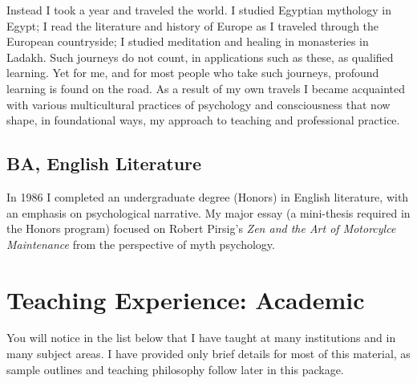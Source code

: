 \documentclass[10pt,DIV09,letterpaper,oneside,headsepline]{scrreprt}
\begin{document}
Instead I took a year and traveled the world. I studied Egyptian mythology in Egypt; I read the literature and history of Europe as I traveled through the European countryside; I studied meditation and healing in monasteries in Ladakh. Such journeys do not count, in applications such as these, as qualified learning. Yet for me, and for most people who take such journeys, profound learning is found on the road. As a result of my own travels I became acquainted with various multicultural practices of psychology and consciousness that now shape, in foundational ways, my approach to teaching and professional practice.

\section{BA, English Literature}

In 1986 I completed an undergraduate degree (Honors) in English literature, with an emphasis on psychological narrative. My major essay (a mini-thesis required in the Honors program) focused on Robert Pirsig's \textit{Zen and the Art of Motorcylce Maintenance} from the perspective of myth psychology.

\chapter{Teaching Experience: Academic}

You will notice in the list below that I have taught at many institutions and in many subject areas. I have provided only brief details for most of this material, as sample outlines and teaching philosophy follow later in this package.
\end{document}
